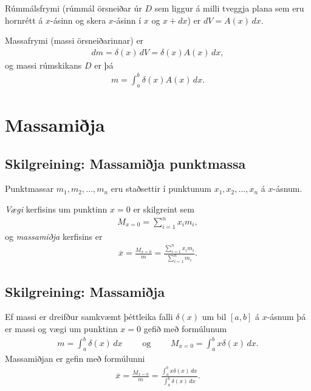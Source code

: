 \documentclass[b5paper,11pt,icelandic]{sphinxmanual}
\begin{document}
Rúmmálsfrymi (rúmmál örsneiðar úr \(D\) sem liggur á milli tveggja
plana sem eru hornrétt á \(x\)-ásinn og skera \(x\)-ásinn í
\(x\) og \(x+dx\)) er \(dV=A(x)\, dx\).

Massafrymi (massi örsneiðarinnar) er
\begin{equation*}
\begin{split}dm=\delta(x)\, dV = \delta(x) A(x)\, dx,\end{split}
\end{equation*}
og massi rúmskikans \(D\) er þá
\begin{equation*}
\begin{split}m=\int_a^b \delta(x)A(x)\, dx.\end{split}
\end{equation*}

\section{Massamiðja}
\label{kafli07:index-13}\label{kafli07:massamija}

\subsection{Skilgreining: Massamiðja punktmassa}
\label{kafli07:skilgreining-massamija-punktmassa}
Punktmassar \(m_1, m_2, \ldots, m_n\) eru staðsettir í punktunum
\(x_1,
x_2, \ldots, x_n\) á \(x\)-ásnum.

\textit{Vægi} kerfisins um punktinn \(x=0\) er skilgreint sem
\begin{equation*}
\begin{split}M_{x=0}=\sum_{i=1}^n x_im_i,\end{split}
\end{equation*}
og \textit{massamiðja} kerfisins er
\begin{equation*}
\begin{split}\overline{x}=\frac{M_{x=0}}{m} = \frac{\sum_{i=1}^n x_im_i}{\sum_{i=1}^n m_i}.\end{split}
\end{equation*}

\subsection{Skilgreining: Massamiðja}
\label{kafli07:skilgreining-massamija}
Ef massi er dreifður samkvæmt þéttleika falli \(\delta(x)\) um bil
\([a, b]\) á \(x\)-ásnum þá er massi og vægi um punktinn
\(x=0\) gefið með formúlunum
\begin{equation*}
\begin{split}m=\int_a^b \delta(x)\,dx
\qquad\mbox{ og }\qquad
M_{x=0}= \int_a^b x\delta(x)\,dx.\end{split}
\end{equation*}
Massamiðjan er gefin með formúlunni
\begin{equation*}
\begin{split}\overline{x}=\frac{M_{x=0}}{m}   =
\frac{\int_a^b x\delta(x)\,dx}{\int_a^b \delta(x)\,dx}.\end{split}
\end{equation*}
\end{document}

